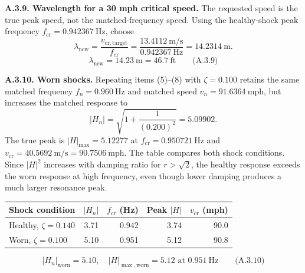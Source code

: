 \textbf{A.3.9. Wavelength for a 30 mph critical speed.} The requested speed is the true peak speed, not the matched-frequency speed. Using the healthy-shock peak frequency $f_{\mathrm{cr}}=0.942367\ \mathrm{Hz}$, choose
\[
\lambda_{\mathrm{new}}=\frac{v_{\mathrm{cr,target}}}{f_{\mathrm{cr}}}
=\frac{13.4112\ \mathrm{m/s}}{0.942367\ \mathrm{Hz}}
=14.2314\ \mathrm{m}.
\]
\[\boxed{\lambda_{\mathrm{new}}=14.23\ \mathrm{m}=46.7\ \mathrm{ft}}\qquad\text{(A.3.9)}\]

\textbf{A.3.10. Worn shocks.} Repeating items (5)--(8) with $\zeta=0.100$ retains the same matched frequency $f_n=0.960\ \mathrm{Hz}$ and matched speed $v_n=91.6364\ \mathrm{mph}$, but increases the matched response to
\[
|H_n|=\sqrt{1+\frac{1}{(0.200)^2}}=5.09902.
\]
The true peak is $|H|_{\max}=5.12277$ at $f_{\mathrm{cr}}=0.950721\ \mathrm{Hz}$ and $v_{\mathrm{cr}}=40.5692\ \mathrm{m/s}=90.7506\ \mathrm{mph}$. The table compares both shock conditions. Since $|H|^2$ increases with damping ratio for $r>\sqrt{2}$, the healthy response exceeds the worn response at high frequency, even though lower damping produces a much larger resonance peak.
{\begin{center}\small\begin{tabular}{@{}lrrrr@{}}
\toprule\noalign{}
Shock condition & $|H_n|$ & $f_{\mathrm{cr}}$ (Hz) & Peak $|H|$ & $v_{\mathrm{cr}}$ (mph) \\
\midrule\noalign{}
Healthy, $\zeta=0.140$ & 3.71 & 0.942 & 3.74 & 90.0 \\
Worn, $\zeta=0.100$ & 5.10 & 0.951 & 5.12 & 90.8 \\
\bottomrule\end{tabular}\end{center}}

\[\boxed{|H_n|_{\mathrm{worn}}=5.10,\quad |H|_{\max,\mathrm{worn}}=5.12\text{ at }0.951\ \mathrm{Hz}}\qquad\text{(A.3.10)}\]

